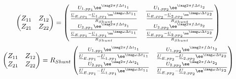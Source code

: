 \[\begin{pmatrix}
 Z_{11} & Z_{12} \\
 Z_{21} & Z_{22} \\
\end{pmatrix}=\begin{pmatrix}
    \frac{U_{{1,pp}_{\mathrm{1}}}\ee^{\imag 2 \pi f \Delta t_{1_\mathrm{1}}} }{\frac{\underline{U}_{{E,pp}_{\mathrm{1}}}-\underline{U}_{{1,pp}_{\mathrm{1}}}\ee^{\imag  \omega \Delta {t_1}_{\mathrm{1}}}}{R_{Shunt}}}&
    \frac{U_{{1,pp}_{\mathrm{2}}}\ee^{\imag 2 \pi f \Delta t_{1_\mathrm{2}}} }{\frac{\underline{U}_{{E,pp}_{\mathrm{2}}}-\underline{U}_{{2,pp}_{\mathrm{2}}}\ee^{\imag  \omega \Delta {t_2}_{\mathrm{2}}}}{R_{Shunt}}}\\
    \frac{ U_{{2,pp}_{\mathrm{1}}}\ee^{\imag 2 \pi f \Delta t_{2_\mathrm{1}}} }{\frac{\underline{U}_{{E,pp}_{\mathrm{1}}}-\underline{U}_{{1,pp}_{\mathrm{1}}}\ee^{\imag  \omega \Delta {t_1}_{\mathrm{1}}}}{R_{Shunt}}}&
    \frac{ U_{{2,pp}_{\mathrm{2}}}\ee^{\imag 2 \pi f \Delta t_{2_\mathrm{2}}} }{\frac{\underline{U}_{{E,pp}_{\mathrm{2}}}-\underline{U}_{{2,pp}_{\mathrm{2}}}\ee^{\imag  \omega \Delta {t_2}_{\mathrm{2}}}}{R_{Shunt}}} 
\end{pmatrix}
\]
\[\begin{pmatrix}
 Z_{11} & Z_{12} \\
 Z_{21} & Z_{22} \\
\end{pmatrix}=R_{Shunt}\begin{pmatrix}
    \frac{U_{{1,pp}_{\mathrm{1}}}\ee^{\imag 2 \pi f \Delta t_{1_\mathrm{1}}} }{\underline{U}_{{E,pp}_{\mathrm{1}}}-\underline{U}_{{1,pp}_{\mathrm{1}}}\ee^{\imag  \omega \Delta {t_1}_{\mathrm{1}}}}&
    \frac{U_{{1,pp}_{\mathrm{2}}}\ee^{\imag 2 \pi f \Delta t_{1_\mathrm{2}}} }{\underline{U}_{{E,pp}_{\mathrm{2}}}-\underline{U}_{{2,pp}_{\mathrm{2}}}\ee^{\imag  \omega \Delta {t_2}_{\mathrm{2}}}}\\
    \frac{ U_{{2,pp}_{\mathrm{1}}}\ee^{\imag 2 \pi f \Delta t_{2_\mathrm{1}}} }{\underline{U}_{{E,pp}_{\mathrm{1}}}-\underline{U}_{{1,pp}_{\mathrm{1}}}\ee^{\imag  \omega \Delta {t_1}_{\mathrm{1}}}}&
    \frac{ U_{{2,pp}_{\mathrm{2}}}\ee^{\imag 2 \pi f \Delta t_{2_\mathrm{2}}} }{\underline{U}_{{E,pp}_{\mathrm{2}}}-\underline{U}_{{2,pp}_{\mathrm{2}}}\ee^{\imag  \omega \Delta {t_2}_{\mathrm{2}}}} 
\end{pmatrix}
\]
